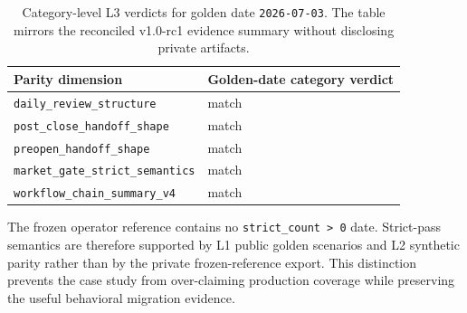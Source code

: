 \documentclass[11pt]{article}
\begin{document}
\begin{table}[t]
\centering
\small
\begin{tabularx}{\linewidth}{lY}
\toprule
Parity dimension & Golden-date category verdict \\
\midrule
\texttt{daily\_review\_structure} & match \\
\texttt{post\_close\_handoff\_shape} & match \\
\texttt{preopen\_handoff\_shape} & match \\
\texttt{market\_gate\_strict\_semantics} & match \\
\texttt{workflow\_chain\_summary\_v4} & match \\
\bottomrule
\end{tabularx}
\caption{Category-level L3 verdicts for golden date \texttt{2026-07-03}. The table mirrors
the reconciled v1.0-rc1 evidence summary without disclosing private artifacts.}
\label{tab:l3-dimensions}
\end{table}

The frozen operator reference contains no \texttt{strict\_count > 0} date. Strict-pass
semantics are therefore supported by L1 public golden scenarios and L2 synthetic parity rather
than by the private frozen-reference export. This distinction prevents the case study from
over-claiming production coverage while preserving the useful behavioral migration evidence.



\end{document}
